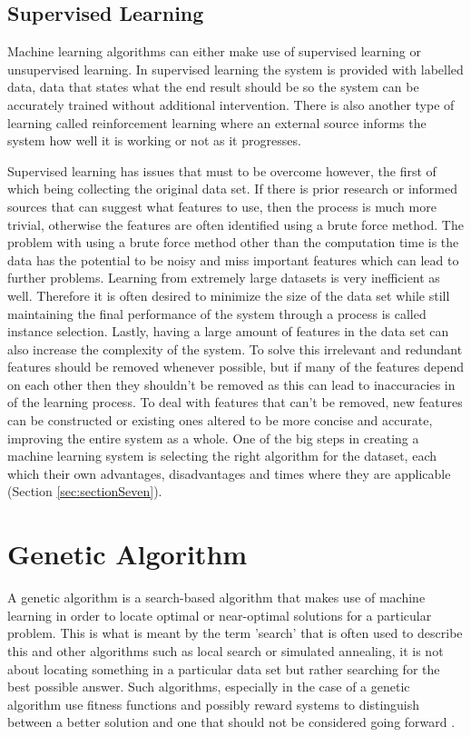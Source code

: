 \subsection{Supervised Learning} \label{sec:supervisedLearning}

Machine learning algorithms can either make use of supervised learning or unsupervised learning.  In supervised learning the system is provided with labelled data, data that states what the end result should be so the system can be accurately trained without additional intervention.  There is also another type of learning called reinforcement learning where an external source informs the system how well it is working or not as it progresses.

Supervised learning has issues that must to be overcome however, the first of which being collecting the original data set.  If there is prior research or informed sources that can suggest what features to use, then the process is much more trivial, otherwise the features are often identified using a brute force method.  The problem with using a brute force method other than the computation time is the data has the potential to be noisy and miss important features which can lead to further problems.  Learning from extremely large datasets is very inefficient as well.  Therefore it is often desired to minimize the  size of the data set while still maintaining the final performance of the system through a process is called instance selection.  Lastly, having a large amount of features in the data set can also increase the complexity of the system.  To solve this irrelevant and redundant features should be removed whenever possible, but if many of the features depend on each other then they shouldn't be removed as this can lead to inaccuracies in of the learning process.  To deal with features that can't be removed, new features can be constructed or existing ones altered to be more concise and accurate, improving the entire system as a whole.  One of the big steps in creating a machine learning system is selecting the right algorithm for the dataset, each which their own advantages, disadvantages and times where they are applicable (Section \ref{sec:sectionSeven}). 

\section{Genetic Algorithm} \label{sec:genAlgorithm}

A genetic algorithm is a search-based algorithm that makes use of machine learning in order to locate optimal or near-optimal solutions for a particular problem.  This is what is meant by the term 'search' that is often used to describe this and other algorithms such as local search or simulated annealing, it is not about locating something in a particular data set but rather searching for the best possible answer.  Such algorithms, especially in the case of a genetic algorithm use fitness functions and possibly reward systems to distinguish between a better solution and one that should not be considered going forward \cite{searchBasedSoftwareEngineering}.

